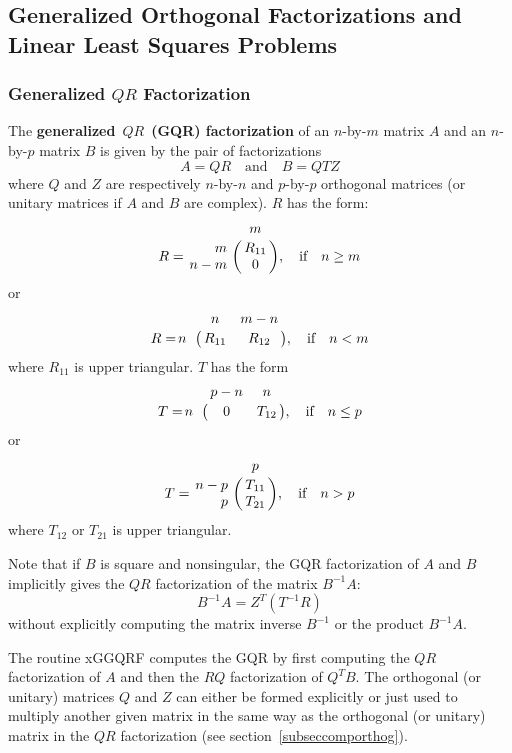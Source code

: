 
\subsection{Generalized Orthogonal Factorizations and Linear Least Squares Problems}
\label{subseccompGENorthog}

\subsubsection{Generalized $QR$ Factorization}

The {\bf generalized}~{\boldmath $QR$}~{\bf (GQR) factorization} of an $n$-by-$m$ matrix $A$ and
an $n$-by-$p$ matrix $B$ is given by the pair of factorizations
\[
A = Q R \quad  \mbox{and} \quad B = Q T Z
\]
where $Q$ and $Z$ are respectively $n$-by-$n$ and $p$-by-$p$ orthogonal matrices
(or unitary matrices if $A$ and $B$ are complex). $R$ has the form:
\[
R = \bordermatrix{    & m   \cr
        \hfill    m   & R_{11} \cr
                  n-m & 0      },   \quad \mbox{if} \quad n \geq m
\]
or
\[
R = \bordermatrix{    & n      &   m-n    \cr
                  n   & R_{11} &  R_{12}  }, \quad \mbox{if} \quad n < m
\]
where $R_{11}$ is upper triangular. $T$ has the form
\[
T = \bordermatrix{    & p-n    &   n    \cr
                  n   & 0      &  T_{12}  }, \quad \mbox{if} \quad n \leq p
\]
or
\[
T = \bordermatrix{    & p   \cr
                  n-p & T_{11} \cr
         \hfill   p   & T_{21} },   \quad \mbox{if} \quad n > p
\]
where $T_{12}$ or $T_{21}$ is upper triangular.

Note that if $B$ is square and nonsingular, the GQR factorization
of $A$ and $B$ implicitly gives the $QR$ factorization of the matrix $B^{-1}A$:
\[
B^{-1} A = Z^T ( T^{-1} R )
\]
without explicitly computing the matrix inverse $B^{-1}$ or the product $B^{-1}A$.

The routine xGGQRF computes the GQR by
first computing the $QR$ factorization of $A$ and then
the $RQ$ factorization of $Q^TB$.
The orthogonal (or unitary) matrices $Q$ and $Z$
can either be formed explicitly or just used to multiply another given matrix
in the same way as the
orthogonal (or unitary) matrix in the $QR$ factorization
(see section~\ref{subseccomporthog}).

